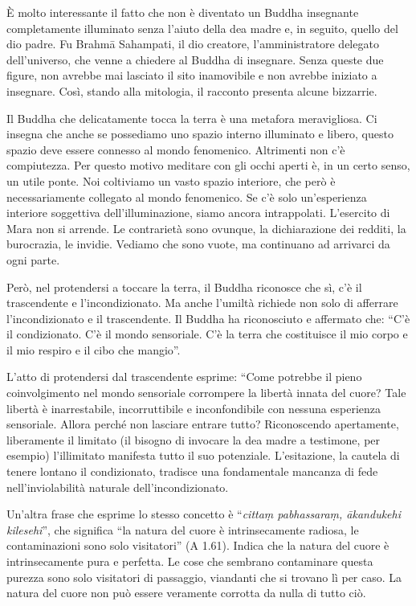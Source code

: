 È molto interessante il fatto che non è diventato un Buddha insegnante completamente illuminato senza l'aiuto della dea madre e, in seguito, quello del dio padre. Fu Brahmā Sahampati, il dio creatore, l'amministratore delegato dell'universo, che venne a chiedere al Buddha di insegnare. Senza queste due figure, non avrebbe mai lasciato il sito inamovibile e non avrebbe iniziato a insegnare. Così, stando alla mitologia, il racconto presenta alcune bizzarrie.

Il Buddha che delicatamente tocca la terra è una metafora meravigliosa. Ci insegna che anche se possediamo uno spazio interno illuminato e libero, questo spazio deve essere connesso al mondo fenomenico. Altrimenti non c'è compiutezza. Per questo motivo meditare con gli occhi aperti è, in un certo senso, un utile ponte. Noi coltiviamo un vasto spazio interiore, che però è necessariamente collegato al mondo fenomenico. Se c'è solo un'esperienza interiore soggettiva dell'illuminazione, siamo ancora intrappolati. L'esercito di Mara non si arrende. Le contrarietà sono ovunque, la dichiarazione dei redditi, la burocrazia, le invidie. Vediamo che sono vuote, ma continuano ad arrivarci da ogni parte.

Però, nel protendersi a toccare la terra, il Buddha riconosce che sì, c'è il trascendente e l'incondizionato. Ma anche l'umiltà richiede non solo di afferrare l'incondizionato e il trascendente. Il Buddha ha riconosciuto e affermato che: ``C'è il condizionato. C'è il mondo sensoriale. C'è la terra che costituisce il mio corpo e il mio respiro e il cibo che mangio''.

L'atto di protendersi dal trascendente esprime: ``Come potrebbe il pieno coinvolgimento nel mondo sensoriale corrompere la libertà innata del cuore? Tale libertà è inarrestabile, incorruttibile e inconfondibile con nessuna esperienza sensoriale. Allora perché non lasciare entrare tutto? Riconoscendo apertamente, liberamente il limitato (il bisogno di invocare la dea madre a testimone, per esempio) l'illimitato manifesta tutto il suo potenziale. L'esitazione, la cautela di tenere lontano il condizionato, tradisce una fondamentale mancanza di fede nell'inviolabilità naturale dell'incondizionato.

Un'altra frase che esprime lo stesso concetto è ``\textit{cittaṃ pabhassaraṃ, ākandukehi kilesehi}'', che significa ``la natura del cuore è intrinsecamente radiosa, le contaminazioni sono solo visitatori'' (A 1.61). Indica che la natura del cuore è intrinsecamente pura e perfetta. Le cose che sembrano contaminare questa purezza sono solo visitatori di passaggio, viandanti che si trovano lì per caso. La natura del cuore non può essere veramente corrotta da nulla di tutto ciò.

